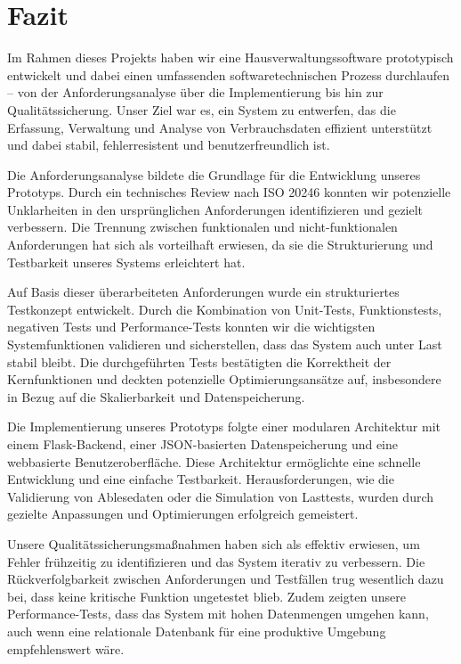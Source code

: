 \section{Fazit}\label{sec:fazit}


Im Rahmen dieses Projekts haben wir eine Hausverwaltungssoftware prototypisch entwickelt und dabei einen umfassenden softwaretechnischen Prozess durchlaufen – von der Anforderungsanalyse über die Implementierung bis hin zur Qualitätssicherung.
Unser Ziel war es, ein System zu entwerfen, das die Erfassung, Verwaltung und Analyse von Verbrauchsdaten effizient unterstützt und dabei stabil, fehlerresistent und benutzerfreundlich ist.

Die Anforderungsanalyse bildete die Grundlage für die Entwicklung unseres Prototyps.
Durch ein technisches Review nach ISO 20246 konnten wir potenzielle Unklarheiten in den ursprünglichen Anforderungen identifizieren und gezielt verbessern.
Die Trennung zwischen funktionalen und nicht-funktionalen Anforderungen hat sich als vorteilhaft erwiesen, da sie die Strukturierung und Testbarkeit unseres Systems erleichtert hat.

Auf Basis dieser überarbeiteten Anforderungen wurde ein strukturiertes Testkonzept entwickelt.
Durch die Kombination von Unit-Tests, Funktionstests, negativen Tests und Performance-Tests konnten wir die wichtigsten Systemfunktionen validieren und sicherstellen, dass das System auch unter Last stabil bleibt.
Die durchgeführten Tests bestätigten die Korrektheit der Kernfunktionen und deckten potenzielle Optimierungsansätze auf, insbesondere in Bezug auf die Skalierbarkeit und Datenspeicherung.

Die Implementierung unseres Prototyps folgte einer modularen Architektur mit einem Flask-Backend, einer JSON-basierten Datenspeicherung und eine webbasierte Benutzeroberfläche.
Diese Architektur ermöglichte eine schnelle Entwicklung und eine einfache Testbarkeit.
Herausforderungen, wie die Validierung von Ablesedaten oder die Simulation von Lasttests, wurden durch gezielte Anpassungen und Optimierungen erfolgreich gemeistert.

Unsere Qualitätssicherungsmaßnahmen haben sich als effektiv erwiesen, um Fehler frühzeitig zu identifizieren und das System iterativ zu verbessern. 
Die Rückverfolgbarkeit zwischen Anforderungen und Testfällen trug wesentlich dazu bei, dass keine kritische Funktion ungetestet blieb.
Zudem zeigten unsere Performance-Tests, dass das System mit hohen Datenmengen umgehen kann, auch wenn eine relationale Datenbank für eine produktive Umgebung empfehlenswert wäre.

